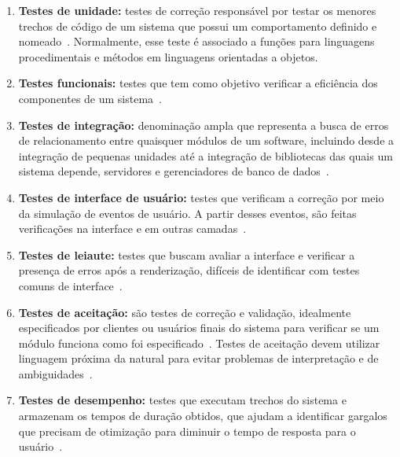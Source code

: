 \begin{enumerate}

\item \textbf{Testes de unidade:} testes de correção responsável por testar os 
menores trechos de código de um sistema que possui um comportamento definido e 
nomeado~\cite{bernardo2011}.
%
Normalmente, esse teste é associado a funções para linguagens procedimentais e métodos em linguagens orientadas a objetos.

\item \textbf{Testes funcionais:} testes que tem como objetivo verificar a eficiência
dos componentes de um sistema~\cite{molinari2003}.

\item \textbf{Testes de integração:} denominação ampla que representa a busca de 
erros de relacionamento entre quaisquer módulos de um software, incluindo desde 
a integração de pequenas unidades até a integração de bibliotecas das quais um 
sistema depende, servidores e gerenciadores de banco de dados~\cite{bernardo2011}.

\item \textbf{Testes de interface de usuário:} testes que verificam a correção 
por meio da simulação de eventos de usuário. A partir desses eventos, são feitas 
verificações na interface e em outras camadas~\cite{bernardo2011}.

\item \textbf{Testes de leiaute:} testes que buscam avaliar a interface 
e verificar a presença de erros após a renderização, difíceis de identificar 
com testes comuns de interface~\cite{bernardo2011}.

\item \textbf{Testes de aceitação:} são testes de correção e validação, idealmente 
especificados por clientes ou usuários finais do sistema para verificar se um 
módulo funciona como foi especificado~\cite{martin2005}.
%
Testes de aceitação devem utilizar linguagem próxima da natural para evitar 
problemas de interpretação e de ambiguidades~\cite{cunningham2005}.

\item \textbf{Testes de desempenho:} testes que executam trechos do sistema e 
armazenam os tempos de duração obtidos, que ajudam a identificar gargalos que 
precisam de otimização para diminuir o tempo de resposta  para o usuário~\cite{liu2009}.


\end{enumerate}
